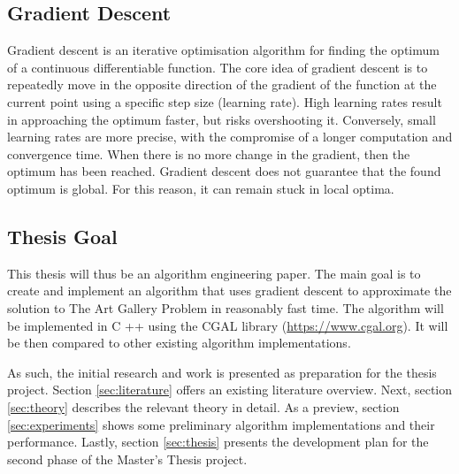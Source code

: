\newpage
\subsection{Gradient Descent}

Gradient descent is an iterative optimisation algorithm for finding the optimum of a continuous differentiable function. The core idea of gradient descent is to repeatedly move in the opposite direction of the gradient of the function at the current point using a specific step size (learning rate). High learning rates result in approaching the optimum faster, but risks overshooting it. Conversely, small learning rates are more precise, with the compromise of a longer computation and convergence time.
When there is no more change in the gradient, then the optimum has been reached. Gradient descent does not guarantee that the found optimum is global. For this reason, it can remain stuck in local optima.

\subsection{Thesis Goal}

This thesis will thus be an algorithm engineering paper. The main goal is to create and implement an algorithm that uses gradient descent to approximate the solution to The Art Gallery Problem \cite{o1987art} in reasonably fast time. The algorithm will be implemented in C ++ using the CGAL library (\url{https://www.cgal.org}). It will be then compared to other existing algorithm implementations.

As such, the initial research and work is presented as preparation for the thesis project. Section \ref{sec:literature} offers an existing literature overview. Next, section \ref{sec:theory} describes the relevant theory in detail.
As a preview, section \ref{sec:experiments} shows some preliminary algorithm implementations and their performance.
Lastly, section \ref{sec:thesis} presents the development plan for the second phase of the Master's Thesis project.